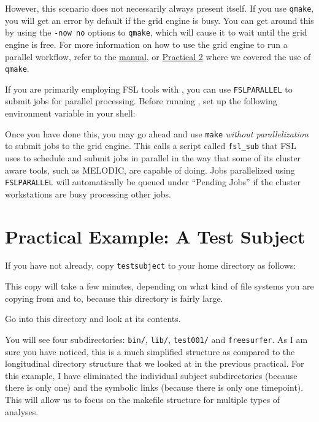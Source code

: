 However, this scenario does not necessarily always present itself. If you use \texttt{qmake}, you will get an error by default if the grid engine is busy. You can get around this by using the \texttt{-now no} options to \texttt{qmake}, which will cause it to wait until the grid engine is free. For more information on how to use the grid engine to run a parallel \maken{} workflow, refer to the \hyperref[sec:gridengine]{manual}, or \hyperref[practicum2]{Practical 2} where we covered the use of \texttt{qmake}. 

If you are primarily employing FSL tools with \maken, you can use \texttt{FSLPARALLEL} to submit jobs for parallel processing. Before running \maken, set up the following environment variable in your shell:

Once you have done this, you may go ahead and use \texttt{make} \emph{without parallelization} to submit jobs to the grid engine. This calls  a script called \texttt{fsl_sub} that FSL uses to schedule and submit jobs in parallel in the way that some of its cluster aware tools, such as MELODIC, are capable of doing. Jobs parallelized using \texttt{FSLPARALLEL} will automatically be queued under ``Pending Jobs'' if the cluster workstations are busy processing other jobs. 

\section{Practical Example: A Test Subject}
If you have not already, copy \texttt{testsubject} to your home directory as follows:

This copy will take a few minutes, depending on what kind of file systems you are copying from and to, because this directory is fairly large.

Go into this directory and look at its contents.

You will see four subdirectories: \texttt{bin/}, \texttt{lib/},
\texttt{test001/} and \texttt{freesurfer}. 
As I am sure you have noticed, this is a much simplified structure as
compared to the longitudinal directory structure that we looked at in
the previous practical. For this example, I have eliminated the individual subject subdirectories (because there is only one) and the symbolic links (because there is only one timepoint). This will allow us to focus on the makefile structure for multiple types of analyses. 

